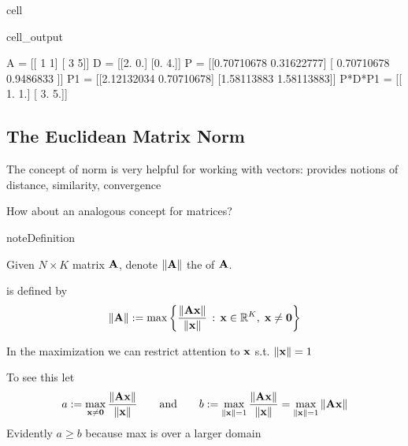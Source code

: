 \documentclass[letterpaper,10pt,english]{jupyterBook}
\begin{document}
\begin{sphinxuseclass}{cell}
\begin{sphinxVerbatimOutput}
\begin{sphinxuseclass}{cell_output}
\begin{sphinxVerbatim}[commandchars=\\\{\}]
A =
[[ 1 \PYGZhy{}1]
 [ 3  5]]
D =
[[2. 0.]
 [0. 4.]]
P =
[[\PYGZhy{}0.70710678  0.31622777]
 [ 0.70710678 \PYGZhy{}0.9486833 ]]
P\PYGZca{}\PYGZhy{}1 =
[[\PYGZhy{}2.12132034 \PYGZhy{}0.70710678]
 [\PYGZhy{}1.58113883 \PYGZhy{}1.58113883]]
P*D*P\PYGZca{}\PYGZhy{}1 =
[[ 1. \PYGZhy{}1.]
 [ 3.  5.]]
\end{sphinxVerbatim}

\end{sphinxuseclass}\end{sphinxVerbatimOutput}

\end{sphinxuseclass}

\subsection{The Euclidean Matrix Norm}
\label{\detokenize{05.linear_algebra:the-euclidean-matrix-norm}}
\sphinxAtStartPar
The concept of norm is very helpful for working with vectors:
provides notions of distance, similarity, convergence

\sphinxAtStartPar
How about an analogous concept for matrices?

\begin{sphinxadmonition}{note}{Definition}

\sphinxAtStartPar
Given \(N \times K\) matrix \({\bf A}\), denote
\(\| {\bf A} \|\) the  of \({\bf A}\).

\sphinxAtStartPar
{} is defined by
\begin{equation*}
\begin{split}
%
\| {\bf A} \| :=
\max \left\{ 
\frac{\| {\bf A} {\bf x} \|}{ \| {\bf x} \|} \,: \, 
{\bf x} \in \mathbb{R}^K, \; {\bf x} \ne {\bf 0}
\right\}
%
\end{split}
\end{equation*}\end{sphinxadmonition}

\sphinxAtStartPar
In the maximization we can restrict attention to \({\bf x}\) s.t. \(\| {\bf x} \| = 1\)

\sphinxAtStartPar
To see this let
\begin{equation*}
\begin{split}
%
a :=
\max_{{\bf x} \ne {\bf 0}} \frac{\| {\bf A} {\bf x} \|}{ \| {\bf x} \|} 
\qquad \text{and} \qquad
b :=
\max_{\| {\bf x} \| = 1} \frac{\| {\bf A} {\bf x} \|}{ \| {\bf x} \|} 
= \max_{\| {\bf x} \| = 1} \| {\bf A} {\bf x} \|
%
\end{split}
\end{equation*}
\sphinxAtStartPar
Evidently \(a \geq b\) because max is over a larger domain
\end{document}
